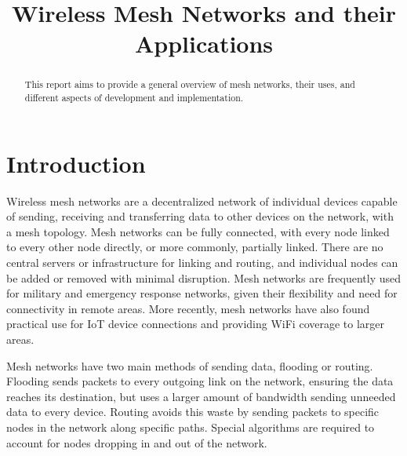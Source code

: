\documentclass[conference]{IEEEtran}
\begin{document}
\title{Wireless Mesh Networks and their Applications}

\author{
}

\maketitle

\begin{abstract}
This report aims to provide a general overview of mesh networks, their uses, and different aspects of development and implementation.
\end{abstract}
\section{Introduction}
Wireless mesh networks are a decentralized network of individual devices capable of sending, receiving and transferring data to other devices on the network, with a mesh topology.
Mesh networks can be fully connected, with every node linked to every other node directly, or more commonly, partially linked. There are no central
servers or infrastructure for linking and routing, and individual nodes can be added or removed with minimal disruption\cite{ramanathan_2018}.  Mesh networks are frequently used for military and emergency
response networks, given their flexibility and need for connectivity in remote areas.  More recently, mesh networks have also found practical use for IoT device connections and providing
WiFi coverage to larger areas.  

Mesh networks have two main methods of sending data, flooding or routing.  Flooding sends packets to every outgoing link on the network, ensuring the data reaches
its destination, but uses a larger amount of bandwidth sending unneeded data to every device.  Routing avoids this waste by sending packets to specific nodes in the network along specific paths.  
Special algorithms are required to account for nodes dropping in and out of the network\cite{enwiki:1003045519}.  
\end{document}

